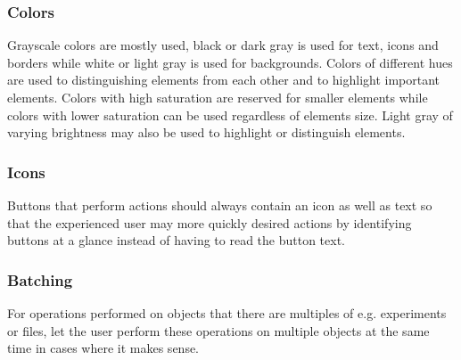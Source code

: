 \subsubsection{Colors}
Grayscale colors are mostly used, black or dark gray is used for text, icons and borders while white or light gray is used for backgrounds. Colors of different hues are used to distinguishing elements from each other and to highlight important elements. Colors with high saturation are reserved for smaller elements while colors with lower saturation can be used regardless of elements size. Light gray of varying brightness may also be used to highlight or distinguish elements.

\subsubsection{Icons}
Buttons that perform actions should always contain an icon as well as text so that the experienced user may more quickly desired actions by identifying buttons at a glance instead of having to read the button text. 

\subsubsection{Batching}
For operations performed on objects that there are multiples of e.g. experiments or files, let the user perform these operations on multiple objects at the same time in cases where it makes sense.
